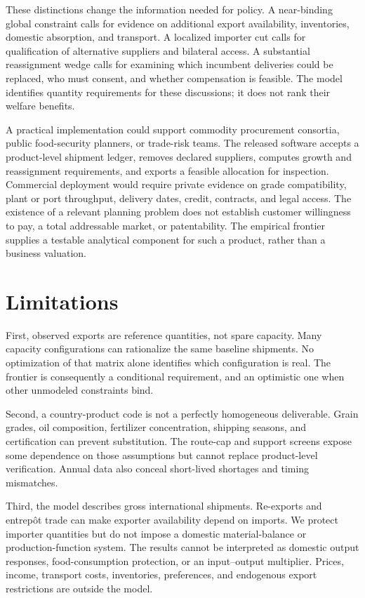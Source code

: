 \documentclass[11pt,a4paper]{article}
\begin{document}
These distinctions change the information needed for policy. A near-binding global constraint calls for evidence on additional export availability, inventories, domestic absorption, and transport. A localized importer cut calls for qualification of alternative suppliers and bilateral access. A substantial reassignment wedge calls for examining which incumbent deliveries could be replaced, who must consent, and whether compensation is feasible. The model identifies quantity requirements for these discussions; it does not rank their welfare benefits.

A practical implementation could support commodity procurement consortia, public food-security planners, or trade-risk teams. The released software accepts a product-level shipment ledger, removes declared suppliers, computes growth and reassignment requirements, and exports a feasible allocation for inspection. Commercial deployment would require private evidence on grade compatibility, plant or port throughput, delivery dates, credit, contracts, and legal access. The existence of a relevant planning problem does not establish customer willingness to pay, a total addressable market, or patentability. The empirical frontier supplies a testable analytical component for such a product, rather than a business valuation.

\section{Limitations}
First, observed exports are reference quantities, not spare capacity. Many capacity configurations can rationalize the same baseline shipments. No optimization of that matrix alone identifies which configuration is real. The frontier is consequently a conditional requirement, and an optimistic one when other unmodeled constraints bind.

Second, a country-product code is not a perfectly homogeneous deliverable. Grain grades, oil composition, fertilizer concentration, shipping seasons, and certification can prevent substitution. The route-cap and support screens expose some dependence on those assumptions but cannot replace product-level verification. Annual data also conceal short-lived shortages and timing mismatches.

Third, the model describes gross international shipments. Re-exports and entrep\^ot trade can make exporter availability depend on imports. We protect importer quantities but do not impose a domestic material-balance or production-function system. The results cannot be interpreted as domestic output responses, food-consumption protection, or an input--output multiplier. Prices, income, transport costs, inventories, preferences, and endogenous export restrictions are outside the model.
\end{document}
